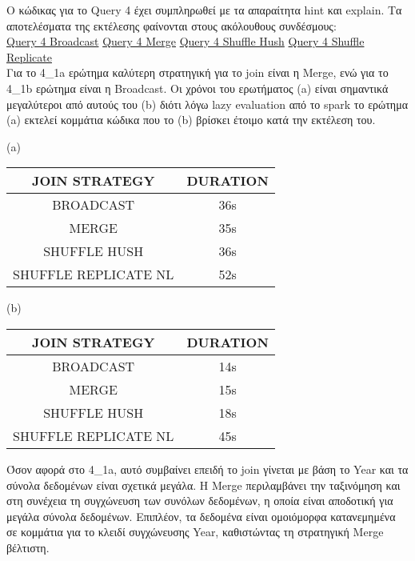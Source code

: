 \documentclass{article}
\begin{document}
Ο κώδικας για το Query 4 έχει συμπληρωθεί με τα απαραίτητα hint και explain.
Τα αποτελέσματα της εκτέλεσης φαίνονται στους ακόλουθους συνδέσμους: \\
\href{http://83.212.81.191:18080/history/application_1705357398960_0019/jobs/} {Query 4 Broadcast}
\href{http://83.212.81.191:18080/history/application_1705357398960_0020/jobs/} {Query 4 Merge}
\href{http://83.212.81.191:18080/history/application_1705357398960_0021/jobs/} {Query 4 Shuffle Hush}
\href{http://83.212.81.191:18080/history/application_1705357398960_0023/jobs/} {Query 4 Shuffle Replicate} \\

Για το 4\_1a ερώτημα καλύτερη στρατηγική για το join είναι η Merge, ενώ για το 4\_1b ερώτημα 
είναι η Broadcast. Οι χρόνοι του ερωτήματος (a) είναι σημαντικά μεγαλύτεροι από αυτούς του 
(b) διότι λόγω lazy evaluation από το spark το ερώτημα (a) εκτελεί κομμάτια κώδικα που το (b) 
βρίσκει έτοιμο κατά την εκτέλεση του.\\

\begin{center}
(a)
\begin{tabular}{|c|c|}
\hline
\textbf{JOIN STRATEGY} & \textbf{DURATION} \\
\hline
BROADCAST & 36s \\
\hline
MERGE & 35s \\
\hline
SHUFFLE HUSH & 36s \\
\hline
SHUFFLE REPLICATE NL & 52s \\
\hline
\end{tabular}
\quad
(b)
\begin{tabular}{|c|c|}
\hline
\textbf{JOIN STRATEGY} & \textbf{DURATION} \\
\hline
BROADCAST & 14s \\
\hline
MERGE & 15s \\
\hline
SHUFFLE HUSH & 18s \\
\hline
SHUFFLE REPLICATE NL & 45s \\
\hline
\end{tabular}
\end{center} 

\vspace{3mm}

Όσον αφορά στο 4\_1a, αυτό συμβαίνει επειδή το join γίνεται με βάση το 
Year και τα σύνολα δεδομένων είναι σχετικά μεγάλα. 
Η Merge περιλαμβάνει την ταξινόμηση και στη συνέχεια τη συγχώνευση των συνόλων δεδομένων, 
η οποία είναι αποδοτική για μεγάλα σύνολα δεδομένων. Επιπλέον, τα δεδομένα είναι ομοιόμορφα 
κατανεμημένα σε κομμάτια για το κλειδί συγχώνευσης Year, καθιστώντας τη στρατηγική Merge 
βέλτιστη. 
\end{document}
